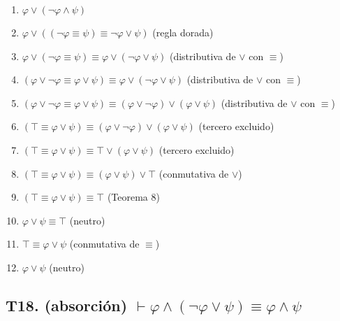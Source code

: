 \begin{enumerate}
    \item $\varphi \lor (\neg\varphi \land \psi)$
    \item $\varphi \lor ((\neg\varphi \equiv \psi) \equiv \neg\varphi \lor \psi)$ \hfill (regla dorada)
    \item $\varphi \lor (\neg\varphi \equiv \psi) \equiv \varphi \lor (\neg\varphi \lor \psi)$ \hfill (distributiva de $\lor$ con $\equiv$)
    \item $(\varphi \lor \neg\varphi \equiv \varphi \lor \psi) \equiv \varphi \lor (\neg\varphi \lor \psi)$ \hfill (distributiva de $\lor$ con $\equiv$)
    \item $(\varphi \lor \neg\varphi \equiv \varphi \lor \psi) \equiv (\varphi \lor \neg\varphi) \lor (\varphi \lor \psi)$ \hfill (distributiva de $\lor$ con $\equiv$)
    \item $(\top \equiv \varphi \lor \psi) \equiv (\varphi \lor \neg\varphi) \lor (\varphi \lor \psi)$ \hfill (tercero excluido)
    \item $(\top \equiv \varphi \lor \psi) \equiv \top \lor (\varphi \lor \psi)$ \hfill (tercero excluido)
    \item $(\top \equiv \varphi \lor \psi) \equiv (\varphi \lor \psi) \lor \top$ \hfill (conmutativa de $\lor$)
    \item $(\top \equiv \varphi \lor \psi) \equiv \top$ \hfill (Teorema 8)
    \item $\varphi \lor \psi \equiv \top$ \hfill (neutro)
    \item $\top \equiv \varphi \lor \psi$ \hfill (conmutativa de $\equiv$)
    \item $\varphi \lor \psi$ \hfill (neutro)
\end{enumerate}


\subsection{T18. (absorción) $\vdash \varphi \land (\neg\varphi \lor \psi) \equiv \varphi \land \psi $}

